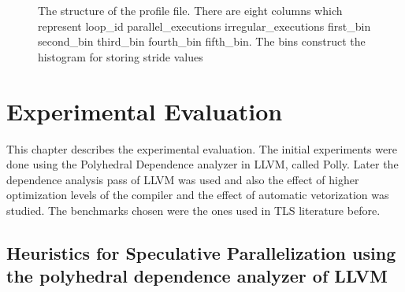 \documentclass[10pt]{report}          %
\begin{document}
\begin{figure}[h]
\begin{center}
\renewcommand{\figure}{Fig.}
\caption{ The structure of the profile file.  There are eight columns which represent loop\_id  parallel\_executions  irregular\_executions  first\_bin  second\_bin  third\_bin  fourth\_bin  fifth\_bin. The bins construct the histogram for storing stride values}
\end{center}
\label{fig:profile_file}
\end{figure}

\chapter{Experimental Evaluation}

This chapter describes the experimental evaluation.  The initial experiments were done using the Polyhedral Dependence analyzer in LLVM, called Polly.  Later the dependence analysis pass of LLVM was used and also the effect of higher optimization levels of the compiler and the effect of automatic vetorization was studied.  The benchmarks chosen were the ones used in TLS literature before.

\section{Heuristics for Speculative Parallelization using the polyhedral dependence analyzer of LLVM}
\label{section:heuristics}
\end{document}
